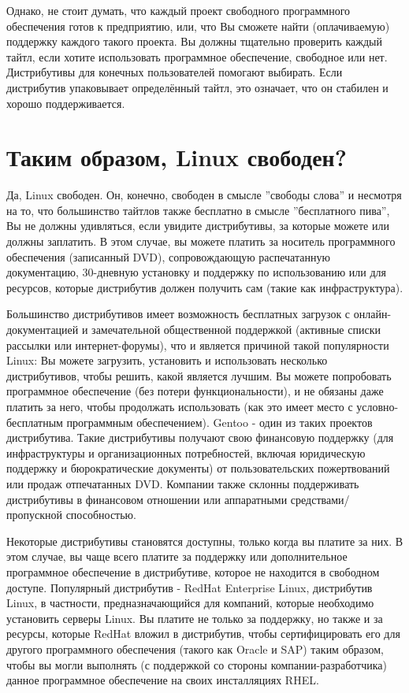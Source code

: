 \documentclass[10pt]{book}
\begin{document}
Однако, не стоит думать, что каждый проект свободного программного обеспечения готов к предприятию, или, что Вы сможете найти (оплачиваемую) поддержку каждого такого проекта. Вы должны тщательно проверить каждый тайтл, если хотите использовать программное обеспечение, свободное или нет. Дистрибутивы для конечных пользователей помогают выбирать. Если дистрибутив упаковывает определённый тайтл, это означает, что он стабилен и хорошо поддерживается.

\section{Таким образом, Linux свободен?}

Да, Linux свободен. Он, конечно, свободен в смысле ''свободы слова'' и несмотря на то, что большинство тайтлов также бесплатно в смысле ''бесплатного пива'', Вы не должны удивляться, если увидите дистрибутивы, за которые можете или должны заплатить. В этом случае, вы можете платить за носитель программного обеспечения (записанный DVD), сопровождающую распечатанную документацию, 30-дневную установку и поддержку по  использованию или для ресурсов, которые дистрибутив должен получить сам (такие как инфраструктура).

Большинство дистрибутивов имеет возможность бесплатных загрузок с онлайн-документацией и замечательной общественной поддержкой (активные списки рассылки или интернет-форумы), что и является причиной такой популярности Linux: Вы можете загрузить, установить и использовать несколько дистрибутивов, чтобы решить, какой является лучшим. Вы можете попробовать программное обеспечение (без потери функциональности), и не обязаны даже платить за него, чтобы продолжать использовать (как это имеет место с условно-бесплатным программным обеспечением). Gentoo - один из таких проектов дистрибутива. Такие дистрибутивы получают свою финансовую поддержку (для инфраструктуры и организационных потребностей, включая юридическую поддержку и бюрократические документы) от пользовательских пожертвований или продаж отпечатанных DVD. Компании также склонны поддерживать дистрибутивы в финансовом отношении или аппаратными средствами/пропускной способностью.

Некоторые дистрибутивы становятся доступны, только когда вы платите за них. В этом случае, вы чаще всего платите за поддержку или дополнительное программное обеспечение в дистрибутиве, которое не находится в свободном доступе. Популярный дистрибутив - RedHat Enterprise Linux, дистрибутив Linux, в частности, предназначающийся для компаний, которые необходимо установить серверы Linux. Вы платите не только за поддержку, но также и за ресурсы, которые RedHat вложил в дистрибутив, чтобы сертифицировать его для другого программного обеспечения (такого как Oracle и SAP) таким образом, чтобы вы могли выполнять (с поддержкой со стороны компании-разработчика)  данное программное обеспечение на своих инсталляциях RHEL.
\end{document}
